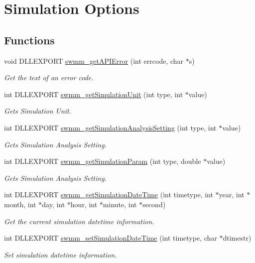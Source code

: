 \hypertarget{group___simulation_settings}{}\section{Simulation Options}
\label{group___simulation_settings}
\subsection*{Functions}
\begin{DoxyCompactItemize}
\item 
void D\+L\+L\+E\+X\+P\+O\+RT \mbox{\hyperlink{group___simulation_settings_gad0599614140f8c3edb3e44fa4ce6914b}{swmm\+\_\+get\+A\+P\+I\+Error}} (int errcode, char $\ast$s)
\begin{DoxyCompactList}\small\item\em Get the text of an error code. \end{DoxyCompactList}\item 
int D\+L\+L\+E\+X\+P\+O\+RT \mbox{\hyperlink{group___simulation_settings_ga2c45b28a68a6661f55dd108d0ee22950}{swmm\+\_\+get\+Simulation\+Unit}} (int type, int $\ast$value)
\begin{DoxyCompactList}\small\item\em Gets Simulation Unit. \end{DoxyCompactList}\item 
int D\+L\+L\+E\+X\+P\+O\+RT \mbox{\hyperlink{group___simulation_settings_ga9ec64a873071a584734f8202582dbe2c}{swmm\+\_\+get\+Simulation\+Analysis\+Setting}} (int type, int $\ast$value)
\begin{DoxyCompactList}\small\item\em Gets Simulation Analysis Setting. \end{DoxyCompactList}\item 
int D\+L\+L\+E\+X\+P\+O\+RT \mbox{\hyperlink{group___simulation_settings_ga3f3a35c715f9d618efabb85bed6e2d08}{swmm\+\_\+get\+Simulation\+Param}} (int type, double $\ast$value)
\begin{DoxyCompactList}\small\item\em Gets Simulation Analysis Setting. \end{DoxyCompactList}\item 
int D\+L\+L\+E\+X\+P\+O\+RT \mbox{\hyperlink{group___simulation_settings_gac261f5224debc1ed0e92c725a1d35213}{swmm\+\_\+get\+Simulation\+Date\+Time}} (int timetype, int $\ast$year, int $\ast$month, int $\ast$day, int $\ast$hour, int $\ast$minute, int $\ast$second)
\begin{DoxyCompactList}\small\item\em Get the current simulation datetime information. \end{DoxyCompactList}\item 
int D\+L\+L\+E\+X\+P\+O\+RT \mbox{\hyperlink{group___simulation_settings_ga2539c5004593b674f972e757828a0759}{swmm\+\_\+set\+Simulation\+Date\+Time}} (int timetype, char $\ast$dtimestr)
\begin{DoxyCompactList}\small\item\em Set simulation datetime information. \end{DoxyCompactList}\end{DoxyCompactItemize}


